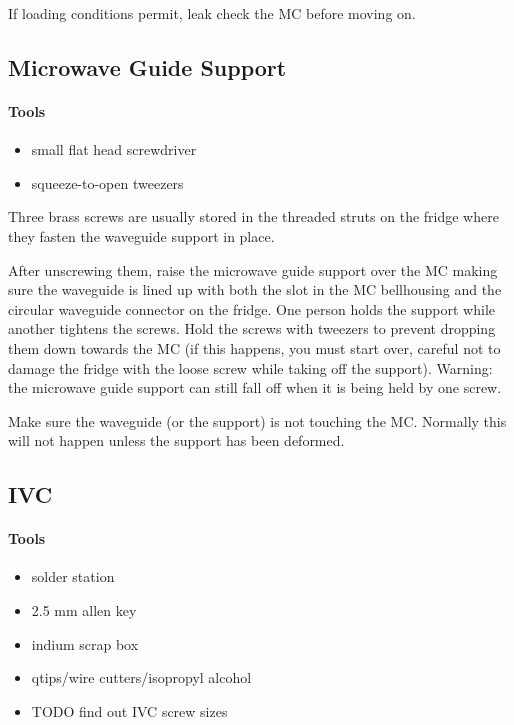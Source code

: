 If loading conditions permit, leak check the MC before moving on.

  \subsection{Microwave Guide Support}
\paragraph{Tools}
\begin{itemize}
 \item small flat head screwdriver
\item squeeze-to-open tweezers
\end{itemize}

Three brass screws are usually stored in the threaded struts on the fridge where they fasten the waveguide support in place.

After unscrewing them, raise the microwave guide support over the MC making sure the waveguide is lined up with both the slot in the MC bellhousing and the circular waveguide connector on the fridge.  One person holds the support while another tightens the screws.  Hold the screws with tweezers to prevent dropping them down towards the MC (if this happens, you must start over, careful not to damage the fridge with the loose screw while taking off the support).  Warning: the microwave guide support can still fall off when it is being held by one screw.

Make sure the waveguide (or the support) is not touching the MC.  Normally this will not happen unless the support has been deformed.

  \subsection{IVC}

\paragraph{Tools}
\begin{itemize}
 \item solder station
\item 2.5 mm allen key
\item indium scrap box
\item qtips/wire cutters/isopropyl alcohol
\item TODO find out IVC screw sizes
\end{itemize}

